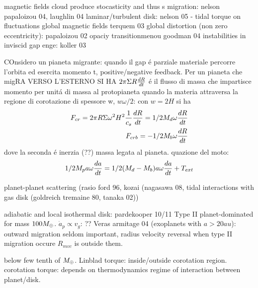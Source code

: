 \begin{workout}
magnetic fields cloud produce stocasticity and thus s migration: nelson papaloizou 04, laughlin 04
laminar/turbulent disk: nelson 05 - tidal torque on fluctuations
global magnetic fields terquem 03
global distortion (non zero eccentricity): papaloizou 02
opaciy transitionmenou goodman 04
instabilities in inviscid gap enge: koller 03
\end{workout}

\begin{workout}
COnsidero un pianeta migrante: quando il gap \'e parziale materiale percorre l'orbita ed esercita momento t, positive/negative feedback.
Per un pianeta che migRA VERSO L'ESTERNO SI HA
$2\pi\Sigma R\TDy{t}{R}$ \'e il flusso di massa che impartisce momento per unit\'a di massa al protopianeta quando la materia attraversa la regione di corotazione di spessore w, $w\omega/2$: con $w=2H$ si ha
\begin{align}
F_{cr}=2\pi R\Sigma\omega^2 H^2\frac{1}{c_s}\TDy{t}{R}=1/2M_d\omega\TDy{t}{R}\\
F_{crb}=-1/2M_b\omega\TDy{t}{R}
\end{align}
dove la seconda \'e inerzia (??) massa legata al pianeta.
quazione del moto:
\begin{equation}
1/2M_pa\omega\TDy{t}{a}=1/2(M_d-M_b)a\omega\TDy{t}{a}+T_{ext}
\end{equation}
\end{workout}

\begin{workout}
planet-planet scattering (rasio ford 96, kozai (nagasawa 08, tidal interactions with gas disk (goldreich tremaine 80, tanaka 02))
\end{workout}

\begin{workout}
adiabatic and local isothermal disk: pardekooper 10/11
Type II planet-dominated for mass $100\mearth{}$.
$\dot{a}_p\propto v_g$: ??
Veras armitage 04 (exoplanets with $a>20au$): outward migration seldom important, radius velocity reversal when type II migration occure $R_{mvc}$ is outside them.
\end{workout}

\begin{workout}[M14:type I]
below few tenth of $\mearth{}$.
Linblad torque: inside/outside corotation region.
corotation torque: depends on thermodynamics regime of interaction between planet/disk.
\end{workout}

